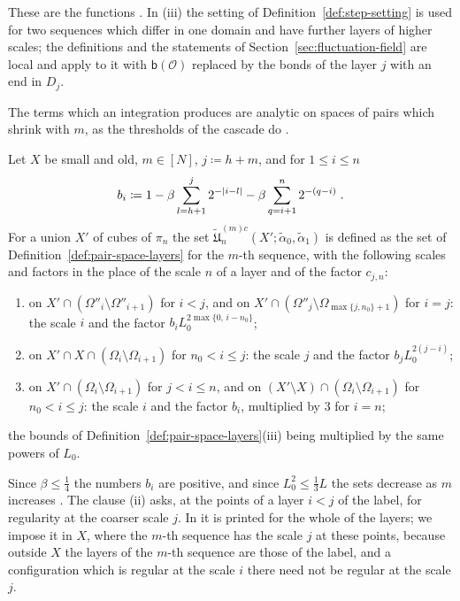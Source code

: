 \documentclass[11pt]{preprint}
\DeclarePairedDelimiter{\abs}{\lvert}{\rvert}
\numberwithin{equation}{section}
\begin{document}
These are the functions \cite[(1.27), (1.28), (1.55)]{BalabanLFR1}. In (iii) the setting of Definition~\ref{def:step-setting} is used for two sequences which differ in one domain and have further layers of higher scales; the definitions and the statements of Section~\ref{sec:fluctuation-field} are local and apply to it with $\mathsf b(\mathcal O)$ replaced by the bonds of the layer $j$ with an end in $D_j$.

The terms which an integration produces are analytic on spaces of pairs which shrink with $m$, as the thresholds of the cascade do \cite[(1.64)--(1.69), pp.~190--191]{BalabanLFR1}.

\begin{definition}\label{def:preparatory-spaces}
Let $X$ be small and old, $m \in [N]$, $j \coloneqq h + m$, and for $1 \leqslant i \leqslant n$
\[
    b_i \coloneqq 1 - \beta\sum_{l=h+1}^{j}2^{-\abs{i-l}} - \beta\sum_{q=i+1}^{n}2^{-(q-i)}\;.
\]
For a union $X'$ of cubes of $\pi_n$ the set $\tilde{\mathfrak U}^{(m)c}_n(X'; \tilde\alpha_0, \tilde\alpha_1)$ is defined as the set of Definition~\ref{def:pair-space-layers} for the $m$-th sequence, with the following scales and factors in the place of the scale $n$ of a layer and of the factor $c_{j,n}$:
\begin{enumerate}[label=(\roman*)]
\item on $X' \cap (\Omega''_i \setminus \Omega''_{i+1})$ for $i < j$, and on $X' \cap (\Omega''_j \setminus \Omega_{\max\{j, n_0\}+1})$ for $i = j$: the scale $i$ and the factor $b_iL_0^{2\max\{0,\, i-n_0\}}$;
\item on $X' \cap X \cap (\Omega_i \setminus \Omega_{i+1})$ for $n_0 < i \leqslant j$: the scale $j$ and the factor $b_jL_0^{2(j-i)}$;
\item on $X' \cap (\Omega_i \setminus \Omega_{i+1})$ for $j < i \leqslant n$, and on $(X' \setminus X) \cap (\Omega_i \setminus \Omega_{i+1})$ for $n_0 < i \leqslant j$: the scale $i$ and the factor $b_i$, multiplied by $3$ for $i = n$;
\end{enumerate}
the bounds of Definition~\ref{def:pair-space-layers}(iii) being multiplied by the same powers of $L_0$.
\end{definition}

Since $\beta \leqslant \frac{1}{4}$ the numbers $b_i$ are positive, and since $L_0^2 \leqslant \frac{1}{3}L$ the sets decrease as $m$ increases \cite[p.~191]{BalabanLFR1}. The clause (ii) asks, at the points of a layer $i < j$ of the label, for regularity at the coarser scale $j$. In \cite[(1.66), p.~190]{BalabanLFR1} it is printed for the whole of the layers; we impose it in $X$, where the $m$-th sequence has the scale $j$ at these points, because outside $X$ the layers of the $m$-th sequence are those of the label, and a configuration which is regular at the scale $i$ there need not be regular at the scale $j$.
\end{document}
